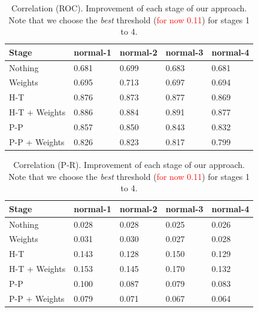 \documentclass[wcp]{jmlr}
\begin{document}
\begin{table}[htbp]
\centering
\caption{Correlation (ROC). Improvement of each stage of our approach. Note that we choose the
         \textit{best} threshold (\textcolor{red}{for now 0.11}) for stages 1 to 4.}
\begin{tabular}{*{5}{l}}
\toprule
Stage               & normal-1 & normal-2 & normal-3 & normal-4 \\
\midrule
Nothing             & 0.681 & 0.699 & 0.683 & 0.681\\
Weights             & 0.695 & 0.713 & 0.697 & 0.694\\
H-T                 & 0.876 & 0.873 & 0.877 & 0.869\\
H-T + Weights       & 0.886 & 0.884 & 0.891 & 0.877\\
P-P                 & 0.857 & 0.850 & 0.843 & 0.832\\
P-P + Weights       & 0.826 & 0.823 & 0.817 & 0.799\\
\bottomrule
\end{tabular}
\end{table}

\begin{table}[htbp]
\centering
\caption{Correlation (P-R). Improvement of each stage of our approach. Note that we choose the
         \textit{best} threshold (\textcolor{red}{for now 0.11}) for stages 1 to 4.}
\begin{tabular}{*{5}{l}}
\toprule
Stage               & normal-1 & normal-2 & normal-3 & normal-4 \\
\midrule
Nothing             & 0.028 & 0.028 & 0.025 & 0.026\\
Weights             & 0.031 & 0.030 & 0.027 & 0.028\\
H-T                 & 0.143 & 0.128 & 0.150 & 0.129\\
H-T + Weights       & 0.153 & 0.145 & 0.170 & 0.132\\
P-P                 & 0.100 & 0.087 & 0.079 & 0.083\\
P-P + Weights       & 0.079 & 0.071 & 0.067 & 0.064\\
\bottomrule
\end{tabular}
\end{table}
\end{document}
